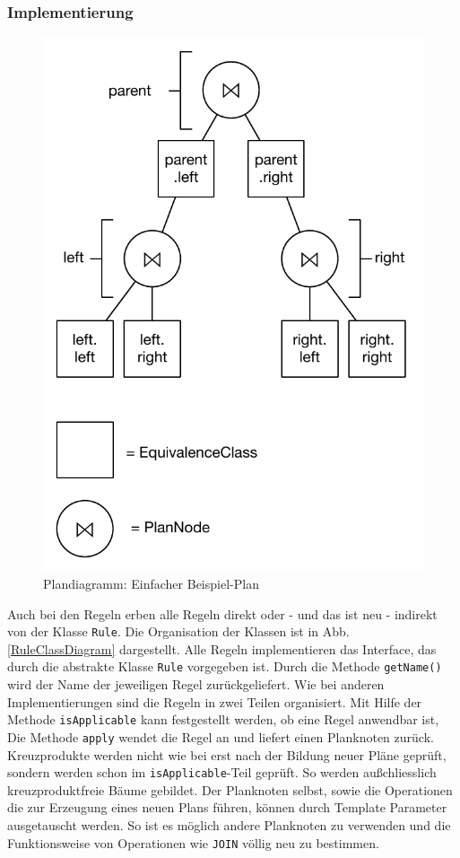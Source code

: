 \subsubsection{Implementierung}


\begin{figure}[ht]
  \centering
  \includegraphics{04_Implementierung/00_media/Plan.pdf}
  \caption{Plandiagramm: Einfacher Beispiel-Plan}
  \label{SimplePlan}
\end{figure}


Auch bei den Regeln erben alle Regeln direkt oder - und das ist neu - indirekt von der Klasse \texttt{Rule}. Die Organisation der Klassen ist in Abb. \ref{RuleClassDiagram} dargestellt. Alle Regeln implementieren das Interface, das durch die abstrakte Klasse \texttt{Rule} vorgegeben ist. Durch die Methode \texttt{getName()} wird der Name der jeweiligen Regel zurückgeliefert. Wie bei anderen Implementierungen sind die Regeln in zwei Teilen organisiert. Mit Hilfe der Methode \texttt{isApplicable} kann festgestellt werden, ob eine Regel anwendbar ist, Die Methode \texttt{apply} wendet die Regel an und liefert einen Planknoten zurück. Kreuzprodukte werden nicht wie bei \cite{shanbhag2014optimizing} erst nach der Bildung neuer Pläne geprüft, sondern werden schon im \texttt{isApplicable}-Teil geprüft. So werden außchliesslich kreuzproduktfreie Bäume gebildet. Der Planknoten selbst, sowie die Operationen die zur Erzeugung eines neuen Plans führen, können durch Template Parameter ausgetauscht werden. So ist es möglich andere Planknoten zu verwenden und die Funktionsweise von Operationen wie \texttt{JOIN} völlig neu zu bestimmen.


